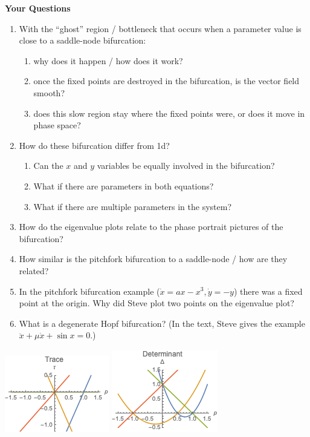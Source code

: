 \documentclass[12pt,letterpaper,noanswers]{exam}
\begin{document}
\noindent\textbf{Your Questions}
\begin{enumerate}
    \item With the ``ghost'' region / bottleneck that occurs when a parameter value is close to a saddle-node bifurcation:
    \begin{enumerate}
        \item why does it happen / how does it work?
        \item once the fixed points are destroyed in the bifurcation, is the vector field smooth?
        \item does this slow region stay where the fixed points were, or does it move in phase space?
    \end{enumerate}
    \item How do these bifurcation differ from 1d?
    \begin{enumerate}
        \item Can the $x$ and $y$ variables be equally involved in the bifurcation?
        \item What if there are parameters in both equations?
        \item What if there are multiple parameters in the system?
    \end{enumerate}
    \item How do the eigenvalue plots relate to the phase portrait pictures of the bifurcation?
    \item How similar is the pitchfork bifurcation to a saddle-node / how are they related?
    \item In the pitchfork bifurcation example ($\dot x = a x - x^3, \dot y = -y$) there was a fixed point at the origin.  Why did Steve plot two points on the eigenvalue plot?
    \item What is a degenerate Hopf bifurcation?  (In the text, Steve gives the example $\ddot x + \mu \dot x + \sin x = 0$.)
\end{enumerate}

\includegraphics{img/C22-2019-10-28p1.png}
\includegraphics{img/C22-2019-10-28p2.png}
\end{document}
